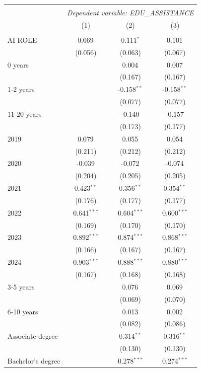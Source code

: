 \begin{table}[!htbp] \centering
\begin{tabular}{@{\extracolsep{5pt}}lccc}
\\[-1.8ex]\hline
\hline \\[-1.8ex]
& \multicolumn{3}{c}{\textit{Dependent variable: EDU_ASSISTANCE}} \
\cr \cline{2-4}
\\[-1.8ex] & (1) & (2) & (3) \\
\hline \\[-1.8ex]
 AI ROLE & 0.069$^{}$ & 0.111$^{*}$ & 0.101$^{}$ \\
& (0.056) & (0.063) & (0.067) \\
 0 years & & 0.004$^{}$ & 0.007$^{}$ \\
& & (0.167) & (0.167) \\
 1-2 years & & -0.158$^{**}$ & -0.158$^{**}$ \\
& & (0.077) & (0.077) \\
 11-20 years & & -0.140$^{}$ & -0.157$^{}$ \\
& & (0.173) & (0.177) \\
 2019 & 0.079$^{}$ & 0.055$^{}$ & 0.054$^{}$ \\
& (0.211) & (0.212) & (0.212) \\
 2020 & -0.039$^{}$ & -0.072$^{}$ & -0.074$^{}$ \\
& (0.204) & (0.205) & (0.205) \\
 2021 & 0.423$^{**}$ & 0.356$^{**}$ & 0.354$^{**}$ \\
& (0.176) & (0.177) & (0.177) \\
 2022 & 0.641$^{***}$ & 0.604$^{***}$ & 0.600$^{***}$ \\
& (0.169) & (0.170) & (0.170) \\
 2023 & 0.892$^{***}$ & 0.874$^{***}$ & 0.868$^{***}$ \\
& (0.166) & (0.167) & (0.167) \\
 2024 & 0.903$^{***}$ & 0.888$^{***}$ & 0.880$^{***}$ \\
& (0.167) & (0.168) & (0.168) \\
 3-5 years & & 0.076$^{}$ & 0.069$^{}$ \\
& & (0.069) & (0.070) \\
 6-10 years & & 0.013$^{}$ & 0.002$^{}$ \\
& & (0.082) & (0.086) \\
 Associate degree & & 0.314$^{**}$ & 0.316$^{**}$ \\
& & (0.130) & (0.130) \\
 Bachelor's degree & & 0.278$^{***}$ & 0.274$^{***}$ \\

\end{tabular}
\end{table}
